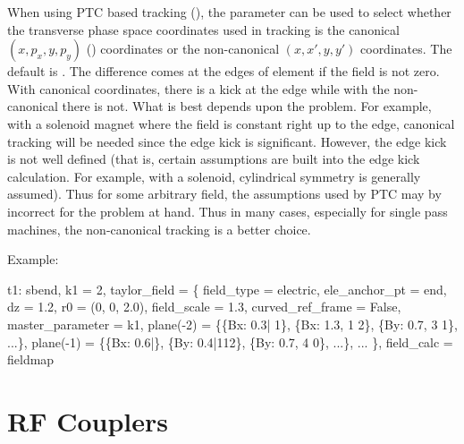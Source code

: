 When using PTC based tracking (), the  parameter can be used
to select whether the transverse phase space coordinates used in tracking is the canonical $(x, p_x,
y, p_y)$ () coordinates or the non-canonical $(x, x', y, y')$ coordinates. The
default is . The difference comes at the edges of element if the field is not zero. With
canonical coordinates, there is a kick at the edge while with the non-canonical there is not. What
is best depends upon the problem. For example, with a solenoid magnet where the field is constant
right up to the edge, canonical tracking will be needed since the edge kick is significant. However,
the edge kick is not well defined (that is, certain assumptions are built into the edge kick
calculation. For example, with a solenoid, cylindrical symmetry is generally assumed). Thus for some
arbitrary field, the assumptions used by PTC may by incorrect for the problem at hand. Thus in many
cases, especially for single pass machines, the non-canonical tracking is a better choice.

Example:
\begin{example}
  t1: sbend, k1 = 2, taylor_field = \{
    field_type = electric,   ele_anchor_pt = end, 
    dz = 1.2,                r0 = (0, 0, 2.0),
    field_scale = 1.3,       curved_ref_frame = False,
    master_parameter = k1,
    plane(-2) = \{\{Bx: 0.3| 1\}, \{Bx: 1.3, 1 2\}, \{By: 0.7, 3 1\}, ...\},
    plane(-1) = \{\{Bx: 0.6|\}, \{By: 0.4|112\}, \{By: 0.7, 4 0\}, ...\}, 
    ...  \}, field_calc = fieldmap
\end{example}

\section{RF Couplers}
\label{s:rf.coupler}

